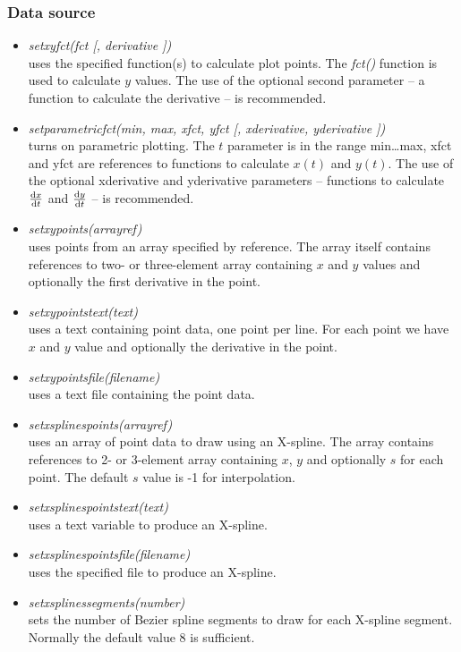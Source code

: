 \documentclass[origlongtable]{scrartcl}
\begin{document}
\subsubsection{Data source}
\begin{itemize}
\item	\textit{set\textunderscore{}xy\textunderscore{}fct(fct [, derivative ])}\/\\
uses the specified function(s) to calculate plot points.
The \textit{fct()\/} function is used to calculate \(y\) values.
The use of the optional second parameter -- a function to calculate the
derivative -- is recommended.
\item	\textit{set\textunderscore{}parametric\textunderscore{}fct(min, max, xfct, yfct [, xderivative, yderivative ])\/}\\
turns on parametric plotting. The \(t\) parameter is in the range
min\ldots{}max, xfct and yfct are references to functions to calculate
\(x(t)\) and \(y(t)\). The use of the optional xderivative and yderivative
parameters -- functions to calculate \(\frac{\mathrm{d} x}{\mathrm{d} t}\)
and \(\frac{\mathrm{d} y}{\mathrm{d} t}\) -- is recommended.
\item	\textit{set\textunderscore{}xy\textunderscore{}points(arrayref)\/}\\
uses points from an array specified by reference. The array itself contains
references to two- or three-element array containing \(x\) and \(y\)
values and optionally the first derivative in the point.
\item	\textit{set\textunderscore{}xy\textunderscore{}points\textunderscore{}text(text)\/}\\
uses a text containing point data, one point per line.
For each point we have \(x\) and \(y\) value and optionally the
derivative in the point.
\item	\textit{set\textunderscore{}xy\textunderscore{}points\textunderscore{}file(filename)\/}\\
uses a text file containing the point data.
\item	\textit{set\textunderscore{}xsplines\textunderscore{}points(arrayref)}\\
uses an array of point data to draw using an X-spline.
The array contains references to 2- or 3-element array
containing \(x\), \(y\) and optionally \(s\) for each point.
The default \(s\) value is -1 for interpolation.
\item	\textit{set\textunderscore{}xsplines\textunderscore{}points\textunderscore{}text(text)}\\
uses a text variable to produce an X-spline.
\item	\textit{set\textunderscore{}xsplines\textunderscore{}points\textunderscore{}file(filename)\/}\\
uses the specified file to produce an X-spline.
\item	\textit{set\textunderscore{}xsplines\textunderscore{}segments(number)}\\
sets the number of Bezier spline segments to draw for each X-spline
segment. Normally the default value 8 is sufficient.
\end{itemize}
\end{document}
